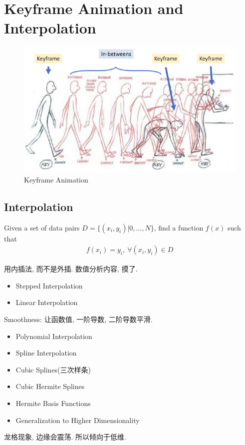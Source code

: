 \newpage
\section{Keyframe Animation and Interpolation}

\begin{figure}[!htb]
    \centering
    \includegraphics[width=0.618\linewidth]{pic/1054/Keyframe Animation}
    \caption{Keyframe Animation}
\end{figure}

\subsection{Interpolation}
Given a set of data pairs $D=\{ (x_i, y_i)| 0,\dots,N \}$, find a function $f(x)$ such that 
\begin{align*}
    f(x_i)=y_i,\ \forall (x_i, y_i)\in D
\end{align*}

用内插法, 而不是外插.  数值分析内容, 摸了.
\begin{itemize}
    \item Stepped Interpolation
    \item Linear Interpolation
\end{itemize}

Smoothness: 让函数值, 一阶导数, 二阶导数平滑. 

\begin{itemize}
    \item Polynomial Interpolation
    \item Spline Interpolation
    \item Cubic Splines(三次样条)
    \item Cubic Hermite Splines
    \item Hermite Basis Functions
    \item Generalization to Higher Dimensionality
\end{itemize}


龙格现象, 边缘会震荡. 所以倾向于低维.


